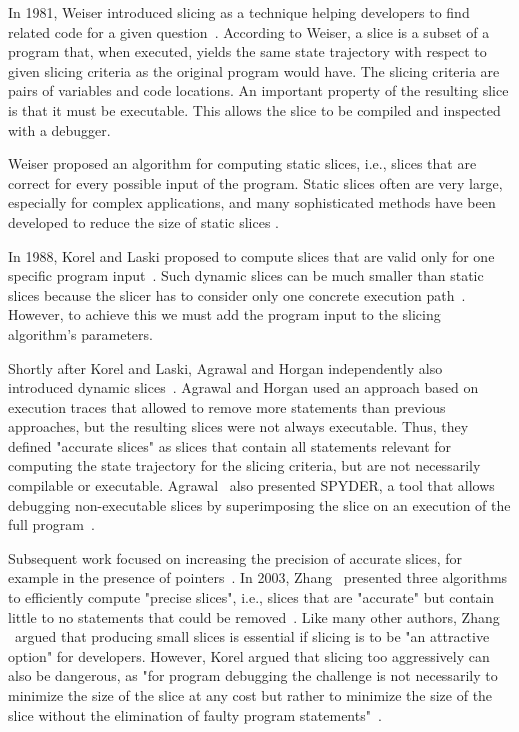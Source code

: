 In 1981, Weiser introduced slicing as a technique helping developers to find related code for a given question~\cite{weiser81:program_slicing}.
According to Weiser, a slice is a subset of a program that, when executed, yields the same state trajectory with respect to given slicing criteria as the original program would have.
The slicing criteria are pairs of variables and code locations.
An important property of the resulting slice is that it must be executable.
This allows the slice to be compiled and inspected with a debugger.

Weiser proposed an algorithm for computing static slices, i.e., slices that are correct for every possible input of the program.
Static slices often are very large, especially for complex applications, and many sophisticated methods have been developed to reduce the size of static slices .

In 1988, Korel and Laski proposed to compute slices that are valid only for one specific program input~\cite{korel88:dynamic_program_slicing}.
Such dynamic slices can be much smaller than static slices because the slicer has to consider only one concrete execution path~\cite{venkatesh95:experimental_results_from_dynamic, hoffner95:evaluation_and_comparison}.
However, to achieve this we must add the program input to the slicing algorithm's parameters.

Shortly after Korel and Laski, Agrawal and Horgan independently also introduced dynamic slices~\cite{agrawal90:dynamic_program_slicing}.
Agrawal and Horgan used an approach based on execution traces that allowed to remove more statements than previous approaches, but the resulting slices were not always executable.
Thus, they defined "accurate slices" as slices that contain all statements relevant for computing the state trajectory for the slicing criteria, but are not necessarily compilable or executable.
Agrawal \etal\ also presented SPYDER, a tool that allows debugging non-executable slices by superimposing the slice on an execution of the full program~\cite{agrawal93:debugging_with_dynamic_slicing}.

Subsequent work focused on increasing the precision of accurate slices, for example in the presence of pointers~\cite{atkinson02:program_slicing_using_dynamic}.
In 2003, Zhang \etal\ presented three algorithms to efficiently compute "precise slices", i.e., slices that are "accurate" but contain little to no statements that could be removed~\cite{zhang03:precise_dynamic_slicing_algorithms}.
Like many other authors, Zhang \etal\ argued that producing small slices is essential if slicing is to be "an attractive option" for developers.
However, Korel argued that slicing too aggressively can also be dangerous, as
"for program debugging the challenge is not necessarily to minimize the size of the slice at any cost but rather to minimize the size of the slice without the elimination of faulty program statements"~\cite{korel98:dynamic_program_slicing_methods}.

